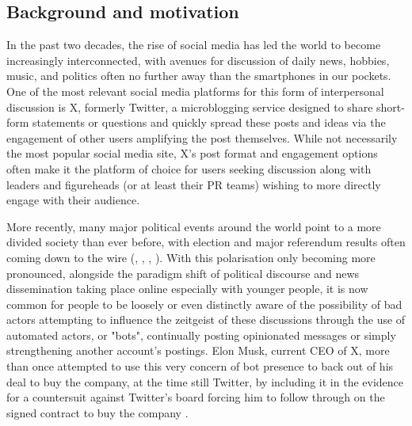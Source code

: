 \documentclass[a4paper,11pt]{article}  %
\begin{document}
	\subsection{Background and motivation}
	\label{subsec:background}
	In the past two decades, the rise of social media has led the world to become increasingly interconnected, with avenues for discussion of daily news, hobbies, music, and politics often no further away than the smartphones in our pockets. One of the most relevant social media platforms for this form of interpersonal discussion is X, formerly Twitter, a microblogging service designed to share short-form statements or questions and quickly spread these posts and ideas via the engagement of other users amplifying the post themselves. While not necessarily the most popular social media site\parencite{BiggestSocialMedia}, X's post format and engagement options often make it the platform of choice for users seeking discussion along with leaders and figureheads (or at least their PR teams) wishing to more directly engage with their audience.
	
	More recently, many major political events around the world point to a more divided society than ever before, with election and major referendum results often coming down to the wire (\textcite{EUReferendumResults}, \textcite{FederalElections2016a}, \textcite{FederalElections2020a}, \textcite{SIGEleicaoResultados}). With this polarisation only becoming more pronounced, alongside the paradigm shift of political discourse and news dissemination taking place online especially with younger people\parencite{shearerSocialMediaOutpaces}, it is now common for people to be loosely or even distinctly aware of the possibility of bad actors attempting to influence the zeitgeist of these discussions through the use of automated actors, or "bots", continually posting opinionated messages or simply strengthening another account's postings. Elon Musk, current CEO of X, more than once attempted to use this very concern of bot presence to back out of his deal to buy the company, at the time still Twitter, by including it in the evidence for a countersuit against Twitter's board forcing him to follow through on the signed contract to buy the company \parencite{MuskPublicVersion}\parencite{elonmusk[@elonmusk]Teslarati20Fake2022}. 
\end{document}
